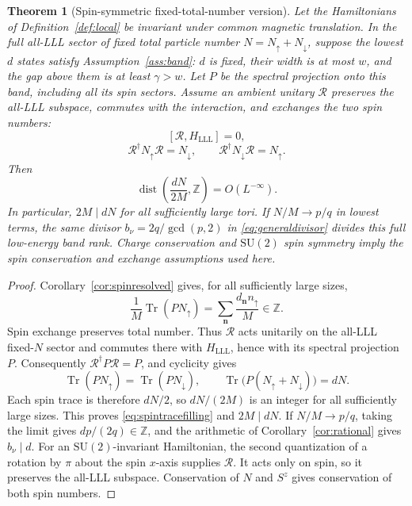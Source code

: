 \documentclass[11pt]{article}
\newtheorem{theorem}{Theorem}[section]
\theoremstyle{definition}
\theoremstyle{remark}
\newcommand{\Tr}{\operatorname{Tr}}
\newcommand{\dist}{\operatorname{dist}}
\newcommand{\up}{\uparrow}
\newcommand{\dn}{\downarrow}
\begin{document}
\begin{theorem}[Spin-symmetric fixed-total-number version]
\label{thm:spinexchange}
Let the Hamiltonians of Definition~\ref{def:local} be invariant
under common magnetic translation.  In the full all-LLL sector
of fixed total particle number \(N=N_\up+N_\dn\), suppose
the lowest \(d\) states satisfy Assumption~\ref{ass:band}:
\(d\) is fixed, their width is at most \(w\), and the gap above
them is at least \(\gamma>w\).  Let \(P\) be the spectral
projection onto this band, including all its spin sectors.
Assume an ambient unitary \(\mathcal R\) preserves the all-LLL
subspace, commutes with the interaction, and exchanges the two spin numbers:
\[
 [\mathcal R,H_{\mathrm{LLL}}]=0,
\]
\[
 \mathcal R^\dagger N_\up \mathcal R=N_\dn,\qquad
 \mathcal R^\dagger N_\dn \mathcal R=N_\up.
\]
Then
\begin{equation}\label{eq:spintracefilling}
 \dist\left(\frac{dN}{2M},\mathbb Z\right)=O(L^{-\infty}).
\end{equation}
In particular, \(2M\mid dN\) for all sufficiently large tori.
If \(N/M\to p/q\) in lowest terms, the same divisor
\(b_\nu=2q/\gcd(p,2)\) in \eqref{eq:generaldivisor} divides
this full low-energy band rank.  Charge conservation and
\(\mathrm{SU}(2)\) spin symmetry imply the spin conservation
and exchange assumptions used here.
\end{theorem}
\begin{proof}
Corollary~\ref{cor:spinresolved} gives, for all sufficiently large
sizes,
\[
 \frac1M\Tr(PN_\up)
   =\sum_{\bm n}\frac{d_{\bm n}n_\up}{M}\in\mathbb Z.
\]
Spin exchange preserves total number.  Thus \(\mathcal R\) acts
unitarily on the all-LLL fixed-\(N\) sector and commutes there
with \(H_{\mathrm{LLL}}\), hence with its spectral projection
\(P\).  Consequently \(\mathcal R^\dagger P\mathcal R=P\),
and cyclicity gives
\[
 \Tr(PN_\up)=\Tr(PN_\dn),\qquad
 \Tr\bigl(P(N_\up+N_\dn)\bigr)=dN.
\]
Each spin trace is therefore \(dN/2\), so \(dN/(2M)\) is an
integer for all sufficiently large sizes.  This proves
\eqref{eq:spintracefilling} and \(2M\mid dN\).
If \(N/M\to p/q\), taking the limit gives \(dp/(2q)\in\mathbb Z\),
and the arithmetic of Corollary~\ref{cor:rational} gives \(b_\nu\mid d\).
For an \(\mathrm{SU}(2)\)-invariant Hamiltonian, the second
quantization of a rotation by \(\pi\) about the spin \(x\)-axis
supplies \(\mathcal R\).  It acts only on spin, so it preserves
the all-LLL subspace.  Conservation of \(N\) and \(S^z\)
gives conservation of both spin numbers.
\end{proof}
\end{document}
